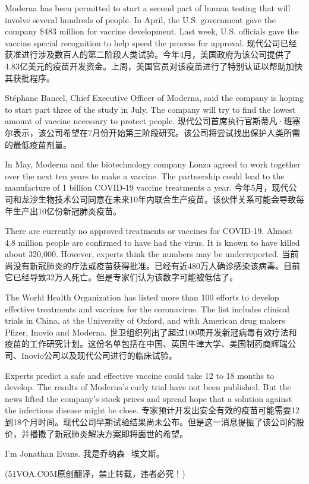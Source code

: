 Moderna has been permitted to start a second part of human testing that will involve several hundreds of people. In April, the U.S. government gave the company \$483 million for vaccine development. Last week, U.S. officials gave the vaccine special recognition to help speed the process for approval.
现代公司已经获准进行涉及数百人的第二阶段人类试验。今年4月，美国政府为该公司提供了4.83亿美元的疫苗开发资金。上周，美国官员对该疫苗进行了特别认证以帮助加快其获批程序。

Stéphane Bancel, Chief Executive Officer of Moderna, said the company is hoping to start part three of the study in July. The company will try to find the lowest amount of vaccine necessary to protect people.
现代公司首席执行官斯蒂凡·班塞尔表示，该公司希望在7月份开始第三阶段研究。该公司将尝试找出保护人类所需的最低疫苗剂量。

In May, Moderna and the biotechnology company Lonza agreed to work together over the next ten years to make a vaccine. The partnership could lead to the manufacture of 1 billion COVID-19 vaccine treatments a year.
今年5月，现代公司和龙沙生物技术公司同意在未来10年内联合生产疫苗。该伙伴关系可能会导致每年生产出10亿份新冠肺炎疫苗。

There are currently no approved treatments or vaccines for COVID-19. Almost 4.8 million people are confirmed to have had the virus. It is known to have killed about 320,000. However, experts think the numbers may be underreported.
当前尚没有新冠肺炎的疗法或疫苗获得批准。已经有近480万人确诊感染该病毒。目前它已经导致32万人死亡。但是专家们认为该数字可能被低估了。

The World Health Organization has listed more than 100 efforts to develop effective treatments and vaccines for the coronavirus. The list includes clinical trials in China, at the University of Oxford, and with American drug makers Pfizer, Inovio and Moderna.
世卫组织列出了超过100项开发新冠病毒有效疗法和疫苗的工作研究计划。这份名单包括在中国、英国牛津大学、美国制药商辉瑞公司、Inovio公司以及现代公司进行的临床试验。

Experts predict a safe and effective vaccine could take 12 to 18 months to develop. The results of Moderna's early trial have not been published. But the news lifted the company's stock prices and spread hope that a solution against the infectious disease might be close.
专家预计开发出安全有效的疫苗可能需要12到18个月时间。现代公司早期试验结果尚未公布。但是这一消息提振了该公司的股价，并播撒了新冠肺炎解决方案即将面世的希望。

I'm Jonathan Evans.
我是乔纳森·埃文斯。

(51VOA.COM原创翻译，禁止转载，违者必究！)
